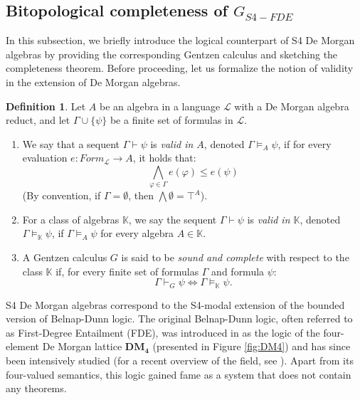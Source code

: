 \documentclass{amsart}
\theoremstyle{plain}
\theoremstyle{definition}
\newtheorem{definition}[theorem]{Definition}
\begin{document}
\subsection{Bitopological completeness of $G_{S4-FDE}$}


In this subsection, we briefly introduce the logical counterpart of S4 De Morgan algebras by providing the corresponding Gentzen calculus and sketching the completeness theorem. Before proceeding, let us formalize the notion of validity in the extension of De Morgan algebras.

\begin{definition}
    Let $A$ be an algebra in a language $\mathcal{L}$ with a De Morgan algebra reduct, and let $\Gamma \cup \{\psi\}$ be a finite set of formulas in $\mathcal{L}$. 

    \begin{enumerate}
        \item We say that a sequent $\Gamma \vdash \psi$ is \textit{valid in $A$}, denoted $\Gamma \vDash_{A} \psi$, if for every evaluation $e: \mathit{Form}_{\mathcal{L}} \to A$, it holds that:
        \[ \bigwedge_{\varphi \in \Gamma} e(\varphi) \leq e(\psi) \]
        (By convention, if $\Gamma = \emptyset$, then $\bigwedge \emptyset = \top^{A}$).
        
        \item For a class of algebras $\mathbb{K}$, we say the sequent $\Gamma \vdash \psi$ is \textit{valid in $\mathbb{K}$}, denoted $\Gamma \vDash_{\mathbb{K}} \psi$, if $\Gamma \vDash_{A} \psi$ for every algebra $A \in \mathbb{K}$.
        
        \item A Gentzen calculus $G$ is said to be \textit{sound and complete} with respect to the class $\mathbb{K}$ if, for every finite set of formulas $\Gamma$ and formula $\psi$:
        \[ \Gamma \vdash_G \psi \iff \Gamma \vDash_{\mathbb{K}} \psi. \]
    \end{enumerate}
\end{definition}

S4 De Morgan algebras correspond to the S4-modal extension of the bounded version of Belnap-Dunn logic. The original Belnap-Dunn logic, often referred to as First-Degree Entailment (FDE), was introduced in \cite{belnap,Dunn:SemanticsBD} as the logic of the four-element De Morgan lattice $\mathbf{DM_4}$ (presented in Figure \ref{fig:DM4}) and has since been intensively studied (for a recent overview of the field, see \cite{Omori-Walsing:40FDE}). Apart from its four-valued semantics, this logic gained fame as a system that does not contain any theorems.
\end{document}
